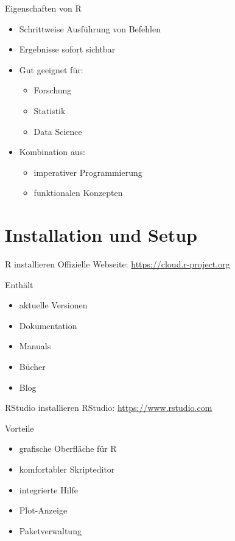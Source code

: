 \documentclass[
  10pt,
  ignorenonframetext,
  aspectratio=169,
]{beamer}
\providecommand{\tightlist}{%
  \setlength{\itemsep}{0pt}\setlength{\parskip}{0pt}}
\begin{document}
\begin{frame}{Eigenschaften von R}
\label{eigenschaften-von-r}
\begin{itemize}
\tightlist
\item
  Schrittweise Ausführung von Befehlen
\item
  Ergebnisse sofort sichtbar
\item
  Gut geeignet für:

  \begin{itemize}
  \tightlist
  \item
    Forschung
  \item
    Statistik
  \item
    Data Science
  \end{itemize}
\item
  Kombination aus:

  \begin{itemize}
  \tightlist
  \item
    imperativer Programmierung
  \item
    funktionalen Konzepten
  \end{itemize}
\end{itemize}
\end{frame}

\begin{frame}
\end{frame}

\section{Installation und Setup}\label{installation-und-setup}

\begin{frame}{R installieren}
\label{r-installieren}
Offizielle Webseite: \url{https://cloud.r-project.org}

Enthält

\begin{itemize}
\tightlist
\item
  aktuelle Versionen
\item
  Dokumentation
\item
  Manuals
\item
  Bücher
\item
  Blog
\end{itemize}
\end{frame}

\begin{frame}{RStudio installieren}
\label{rstudio-installieren}
RStudio: \url{https://www.rstudio.com}

Vorteile

\begin{itemize}
\tightlist
\item
  grafische Oberfläche für R
\item
  komfortabler Skripteditor
\item
  integrierte Hilfe
\item
  Plot-Anzeige
\item
  Paketverwaltung
\end{itemize}
\end{frame}
\end{document}
